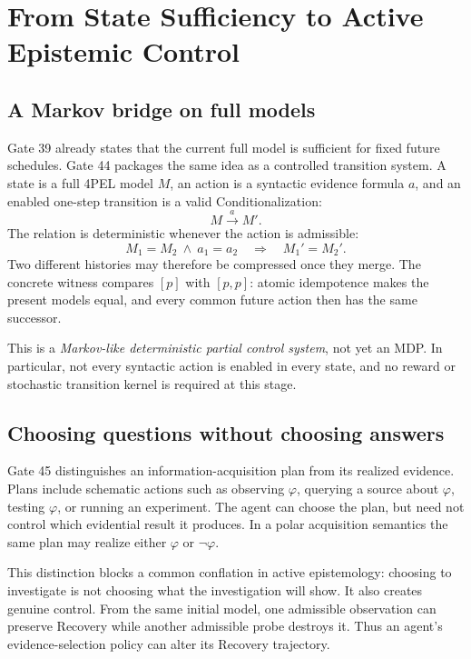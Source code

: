 \section{From State Sufficiency to Active Epistemic Control}

\subsection{A Markov bridge on full models}

Gate 39 already states that the current full model is sufficient for fixed future schedules. Gate 44 packages the same idea as a controlled transition system. A state is a full 4PEL model $M$, an action is a syntactic evidence formula $a$, and an enabled one-step transition is a valid Conditionalization:
\[
M\xrightarrow{a}M'.
\]
The relation is deterministic whenever the action is admissible:
\[
M_1=M_2\ \land\ a_1=a_2
\quad\Longrightarrow\quad
M_1'=M_2'.
\]
Two different histories may therefore be compressed once they merge. The concrete witness compares $[p]$ with $[p,p]$: atomic idempotence makes the present models equal, and every common future action then has the same successor.

This is a \emph{Markov-like deterministic partial control system}, not yet an MDP. In particular, not every syntactic action is enabled in every state, and no reward or stochastic transition kernel is required at this stage.

\subsection{Choosing questions without choosing answers}

Gate 45 distinguishes an information-acquisition plan from its realized evidence. Plans include schematic actions such as observing $\varphi$, querying a source about $\varphi$, testing $\varphi$, or running an experiment. The agent can choose the plan, but need not control which evidential result it produces. In a polar acquisition semantics the same plan may realize either $\varphi$ or $\neg\varphi$.

This distinction blocks a common conflation in active epistemology: choosing to investigate is not choosing what the investigation will show. It also creates genuine control. From the same initial model, one admissible observation can preserve Recovery while another admissible probe destroys it. Thus an agent's evidence-selection policy can alter its Recovery trajectory.

